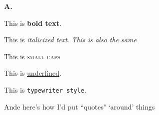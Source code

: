 \documentclass{article}
\begin{document}
\textbf{A.}



This is \textbf{bold text}.

This is \textit{italicized text}. \emph{This is also the same}

This is \textsc{small caps}

This is \underline{underlined}.

This is \texttt{typewriter style}.

Ande here's how I'd put ``quotes" `around' things
    
\end{document}

